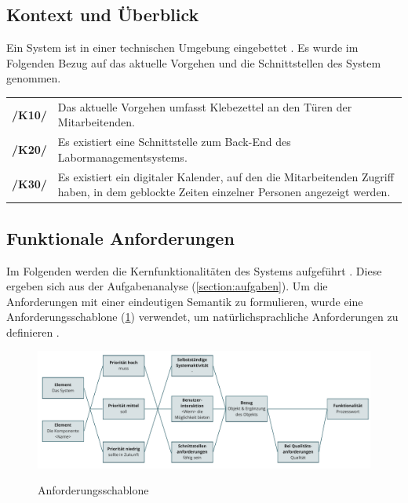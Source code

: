 \subsection*{Kontext und Überblick}
\label{section:kontextueberblick}
Ein System ist in einer technischen Umgebung eingebettet \cite{balzert2009}. Es wurde im Folgenden Bezug auf das aktuelle Vorgehen und die Schnittstellen des System genommen.

\begin{center}
        \renewcommand{\arraystretch}{1.5}
        \begin{tabular}{p{}p{}}
                \hline
                \textbf{/K10/} & Das aktuelle Vorgehen umfasst Klebezettel an den Türen der Mitarbeitenden.                                                                  \\
                \textbf{/K20/} & Es existiert eine Schnittstelle zum Back-End des Labormanagementsystems.                                                                    \\
                \textbf{/K30/} & Es existiert ein digitaler Kalender, auf den die Mitarbeitenden Zugriff haben, in dem geblockte Zeiten einzelner Personen angezeigt werden. \\
                \hline
        \end{tabular}
\end{center}

\subsection*{Funktionale Anforderungen}
\label{section:funktionale}
Im Folgenden werden die Kernfunktionalitäten des Systems aufgeführt \cite{balzert2009}.
Diese ergeben sich aus der Aufgabenanalyse (\ref{section:aufgaben}). Um die Anforderungen mit einer eindeutigen Semantik zu formulieren, wurde eine Anforderungsschablone (\ref{fig:schablone}) verwendet, um natürlichsprachliche Anforderungen zu definieren \cite{balzert2009}.

\begin{figure}[h]
        \centering
        \includegraphics[scale=0.45]{Bilder/anforderungsschablone.pdf}
        \label{fig:schablone}
        \caption[Anforderungsschablone]{Anforderungsschablone \cite{balzert2009}}
\end{figure}

